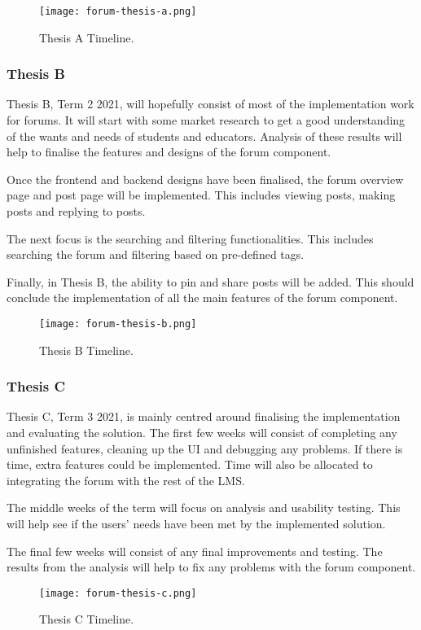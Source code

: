 \begin{figure}[h!]
    \texttt{[image: forum-thesis-a.png]}
    \centering
    \caption{Thesis A Timeline.}
\end{figure}

\newpage

\subsubsection{Thesis B}
Thesis B, Term 2 2021, will hopefully consist of most of the implementation work for forums.
It will start with some market research to get a good understanding of the wants and needs of students and educators.
Analysis of these results will help to finalise the features and designs of the forum component.

Once the frontend and backend designs have been finalised, the forum overview page and post page will be implemented.
This includes viewing posts, making posts and replying to posts.

The next focus is the searching and filtering functionalities.
This includes searching the forum and filtering based on pre-defined tags.

Finally, in Thesis B, the ability to pin and share posts will be added.
This should conclude the implementation of all the main features of the forum component.

\begin{figure}[h!]
    \texttt{[image: forum-thesis-b.png]}
    \centering
    \caption{Thesis B Timeline.}
\end{figure}

\subsubsection{Thesis C}
Thesis C, Term 3 2021, is mainly centred around finalising the implementation and evaluating the solution.
The first few weeks will consist of completing any unfinished features, cleaning up the UI and debugging any problems.
If there is time, extra features could be implemented.
Time will also be allocated to integrating the forum with the rest of the LMS.

The middle weeks of the term will focus on analysis and usability testing.
This will help see if the users' needs have been met by the implemented solution.

The final few weeks will consist of any final improvements and testing.
The results from the analysis will help to fix any problems with the forum component.

\begin{figure}[h!]
    \texttt{[image: forum-thesis-c.png]}
    \centering
    \caption{Thesis C Timeline.}
\end{figure}